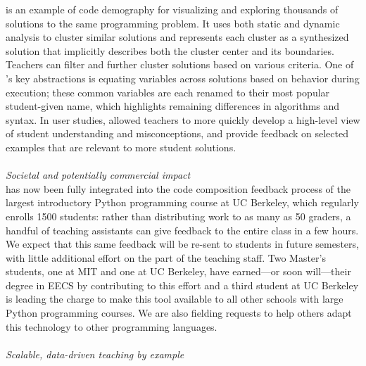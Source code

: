 \documentclass[justified]{tufte-handout}
\begin{document}
 is an example of code demography for visualizing and exploring thousands of solutions to the same programming problem. It uses both static and dynamic analysis to cluster similar solutions and represents each cluster as a synthesized solution that implicitly describes both the cluster center and its boundaries. Teachers can filter and further cluster solutions based on various criteria. One of 's key abstractions is equating variables across solutions based on behavior during execution; these common variables are each renamed to their most popular student-given name, which highlights remaining differences in algorithms and syntax. In user studies,  allowed teachers to more quickly develop a high-level view of student understanding and misconceptions, and provide feedback on selected examples that are relevant to more student solutions. %
\\\\
\noindent
\emph{Societal and potentially commercial impact}\\
 has now been fully integrated into the code composition feedback process of the largest introductory Python programming course at UC Berkeley, which regularly enrolls 1500 students: rather than distributing work to as many as 50 graders, a handful of teaching assistants can give feedback to the entire class in a few hours. We expect that this same feedback will be re-sent to students in future semesters, with little additional effort on the part of the teaching staff. Two Master's students, one at MIT and one at UC Berkeley, have earned---or soon will---their degree in EECS by contributing to this effort and a third student at UC Berkeley is leading the charge to make this tool available to all other schools with large Python programming courses. We are also fielding requests to help others adapt this technology to other programming languages.
\\\\
\noindent
\emph{Scalable, data-driven teaching by example}\\
\end{document}
